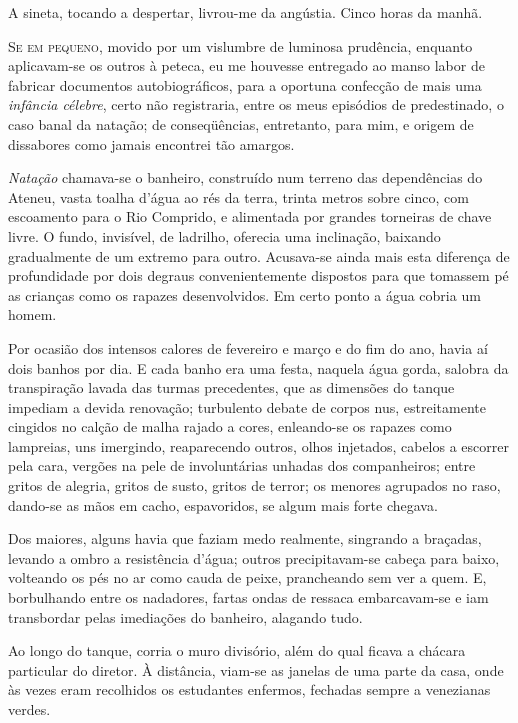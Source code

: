 A sineta, tocando a despertar, livrou{}-me
da angústia. Cinco horas da manhã. 

\sectionitem

\noindent\textsc{Se em pequeno}, movido por um vislumbre de luminosa prudência, enquanto
aplicavam{}-se os outros à peteca, eu me houvesse entregado ao manso
labor de fabricar documentos autobiográficos, para a oportuna confecção
de mais uma \textit{infância célebre}, certo não registraria, entre os meus
episódios de predestinado, o caso banal da natação; de conseqüências,
entretanto, para mim, e origem de dissabores como jamais encontrei tão amargos.
 
\textit{Natação} chamava{}-se o banheiro, construído num terreno das dependências do 
Ateneu, vasta toalha d'água ao rés da terra, trinta metros sobre cinco, 
com escoamento para o Rio Comprido, e alimentada por grandes torneiras de
chave livre. O fundo, invisível, de ladrilho, oferecia uma inclinação,
baixando gradualmente de um extremo para outro. Acusava{}-se ainda mais
esta diferença de profundidade por dois degraus convenientemente
dispostos para que tomassem pé as crianças como os rapazes
desenvolvidos. Em certo ponto a água cobria um homem. 


Por ocasião dos
intensos calores de fevereiro e março e do fim do ano, havia aí dois
banhos por dia. E cada banho era uma festa, naquela água gorda, salobra
da transpiração lavada das turmas precedentes, que as dimensões do
tanque impediam a devida renovação; turbulento debate de corpos nus,
estreitamente cingidos no calção de malha rajado a cores, enleando{}-se
os rapazes como lampreias, uns imergindo, reaparecendo outros, olhos
injetados, cabelos a escorrer pela cara, vergões na pele de
involuntárias unhadas dos companheiros; entre gritos de alegria, gritos
de susto, gritos de terror; os menores agrupados no raso, dando{}-se as
mãos em cacho, espavoridos, se algum mais forte chegava. 


Dos maiores, alguns havia que faziam medo realmente, singrando a braçadas, 
levando a ombro a resistência d'água; outros precipitavam{}-se cabeça para baixo,
volteando os pés no ar como cauda de peixe, prancheando sem ver a quem.
E, borbulhando entre os nadadores, fartas ondas de ressaca
embarcavam{}-se e iam transbordar pelas imediações do banheiro,
alagando tudo. 

Ao longo do tanque, corria o muro divisório, além do
qual ficava a chácara particular do diretor. À distância, viam{}-se as
janelas de uma parte da casa, onde às vezes eram recolhidos os
estudantes enfermos, fechadas sempre a venezianas verdes. 

